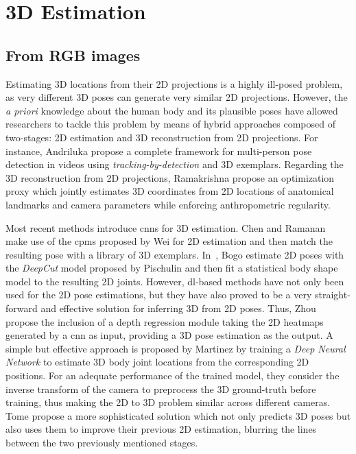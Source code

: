 \section{3D Estimation}\label{subsec:dl_3d_estimation}
\subsection{From RGB images}\label{subsec:from_rgb_images}
Estimating 3D locations from their 2D projections is a highly ill-posed problem, as very different 3D poses can generate very similar 2D projections. However, the \emph{a priori} knowledge about the human body and its plausible poses have allowed researchers to tackle this problem by means of hybrid approaches composed of two-stages: 2D estimation and 3D reconstruction from 2D projections. For instance, Andriluka \etal\cite{Andriluka2010-oc} propose a complete framework for multi-person pose detection in videos using \emph{tracking-by-detection} and 3D exemplars. Regarding the 3D reconstruction from 2D projections, Ramakrishna \etal\cite{Ramakrishna2012-ti} propose an optimization proxy which jointly estimates 3D coordinates from 2D locations of anatomical landmarks and camera parameters while enforcing anthropometric regularity.

Most recent methods introduce \glspl{cnn} for 3D estimation. Chen and Ramanan~\cite{Chen2017-ug} make use of the \glspl{cpm} proposed by Wei \etal\cite{Wei2016-rb} for 2D estimation and then match the resulting pose with a library of 3D exemplars. In~\cite{Bogo2016-kk}, Bogo \etal estimate 2D poses with the \emph{DeepCut} model proposed by Pischulin \etal\cite{Pishchulin2013-zi} and then fit a statistical body shape model to the resulting 2D joints. However, \gls{dl}-based methods have not only been used for the 2D pose estimations, but they have also proved to be a very straight-forward and effective solution for inferring 3D from 2D poses. Thus, Zhou \etal\cite{Zhang2015-js} propose the inclusion of a depth regression module taking the 2D heatmaps generated by a \gls{cnn} as input, providing a 3D pose estimation as the output. A simple but effective approach is proposed by Martinez \etal\cite{Martinez2017-su} by training a \emph{Deep Neural Network} to estimate 3D body joint locations from the corresponding 2D positions. For an adequate performance of the trained model, they consider the inverse transform of the camera to preprocess the 3D ground-truth before training, thus making the 2D to 3D problem similar across different cameras. Tome \etal\cite{Tome2017-ja} propose a more sophisticated solution which not only predicts 3D poses but also uses them to improve their previous 2D estimation, blurring the lines between the two previously mentioned stages.

